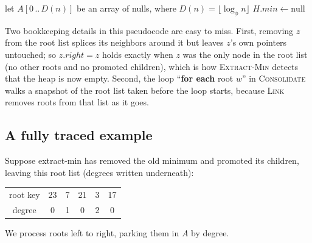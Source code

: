 \begin{algorithm}[H]
\caption{\textsc{Consolidate}($H$)}
let $A[0\,..\,D(n)]$ be an array of nulls, where $D(n) = \lfloor \log_\phi n\rfloor$\;
$H.\mathit{min} \gets \text{null}$\;
\end{algorithm}

Two bookkeeping details in this pseudocode are easy to miss. First, removing $z$
from the root list splices its neighbors around it but leaves $z$'s own
pointers untouched; so $z.\mathit{right} = z$ holds exactly when $z$ was the only
node in the root list (no other roots and no promoted children), which is how
\textsc{Extract-Min} detects that the heap is now empty. Second, the loop
``\textbf{for each} root $w$'' in \textsc{Consolidate} walks a snapshot of the
root list taken before the loop starts, because \textsc{Link} removes roots from
that list as it goes.

\subsection{A fully traced example}

Suppose extract-min has removed the old
minimum and promoted its children, leaving this root list (degrees written
underneath):

\begin{center}
\begin{tabular}{cccccc}
root key & 23 & 7 & 21 & 3 & 17 \\
degree   & 0  & 1 & 0  & 2 & 0 \\
\end{tabular}
\end{center}

We process roots left to right, parking them in $A$ by degree.

